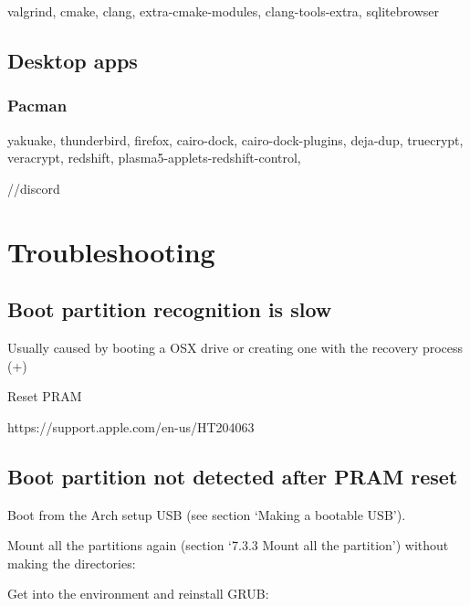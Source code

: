 valgrind, cmake, clang, extra-cmake-modules, clang-tools-extra, 
sqlitebrowser

\subsection{Desktop apps}


\subsubsection{Pacman}

yakuake, thunderbird, firefox, cairo-dock, cairo-dock-plugins, deja-dup, truecrypt, veracrypt, 
redshift, plasma5-applets-redshift-control, 



//discord

\section{Troubleshooting}

\subsection{Boot partition recognition is slow}

Usually caused by booting a OSX drive or creating one with the recovery process (+)

Reset PRAM

https://support.apple.com/en-us/HT204063

\subsection{Boot partition not detected after PRAM reset}

Boot from the Arch setup USB (see section `Making a bootable USB').

Mount all the partitions again (section `7.3.3 Mount all the partition') without making the directories:


Get into the  environment and reinstall GRUB:


